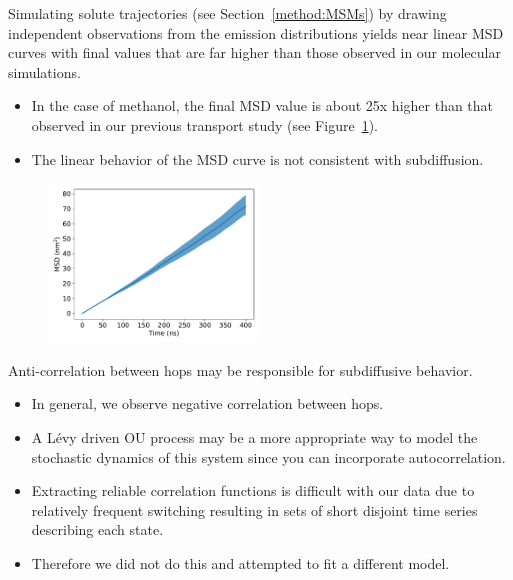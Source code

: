 \documentclass{article}
\begin{document}
  Simulating solute trajectories (see Section~\ref{method:MSMs}) by drawing independent  
  observations from the emission distributions yields near linear MSD curves
  with final values that are far higher than those observed in our molecular simulations.
  \begin{itemize}
    \item In the case of methanol, the final MSD value is about 25x higher than that observed in our
    previous transport study (see Figure~\ref{fig:msd_MET}).
    \item The linear behavior of the MSD curve is not consistent with subdiffusion.
  \end{itemize}
  \begin{figure}[!h]
  \centering
  \includegraphics[width=0.5\textwidth]{MET_msd.pdf}
  \caption{}\label{fig:msd_MET}
  \end{figure}
  
  \noindent Anti-correlation between hops may be responsible for subdiffusive behavior.
  \begin{itemize}
    \item In general, we observe negative correlation between hops.
    \item A L\'evy driven OU process may be a more appropriate way to model
    the stochastic dynamics of this system since you can incorporate autocorrelation.
    \item Extracting reliable correlation functions is difficult with our data
    due to relatively frequent switching resulting in sets of short disjoint time 
    series describing each state.
    \item Therefore we did not do this and attempted to fit a different model. 
  \end{itemize}
\end{document}
